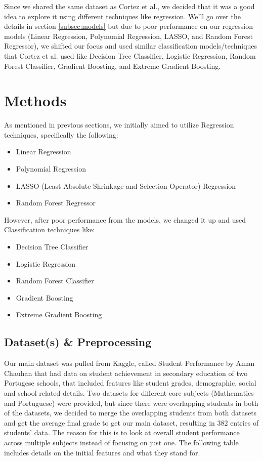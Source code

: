 \documentclass[11pt,a4paper]{article}
\begin{document}
Since we shared the same dataset as Cortez et al., we decided that it was a good idea to explore it using different techniques like regression. We'll go over the details in section \ref{subsec:models} but due to poor performance on our regression models (Linear Regression, Polynomial Regression, LASSO, and Random Forest Regressor), we shifted our focus and used similar classification models/techniques that Cortez et al. used like Decision Tree Classifier, Logistic Regression, Random Forest Classifier, Gradient Boosting, and Extreme Gradient Boosting.

\section{Methods}
As mentioned in previous sections, we initially aimed to utilize Regression techniques, specifically the following:
\begin{itemize}
    \item Linear Regression
    \item Polynomial Regression
    \item LASSO (Least Absolute Shrinkage and Selection Operator) Regression
    \item Random Forest Regressor
\end{itemize}

However, after poor performance from the models, we changed it up and used Classification techniques like:
\begin{itemize}
    \item Decision Tree Classifier
    \item Logistic Regression
    \item Random Forest Classifier
    \item Gradient Boosting
    \item Extreme Gradient Boosting
\end{itemize}

\subsection{Dataset(s) \& Preprocessing}
Our main dataset was pulled from Kaggle, called Student Performance by Aman Chauhan that had data on student achievement in secondary education of two Portugese schools, that included features like student grades, demographic, social and school related details. Two datasets for different core subjects (Mathematics and Portuguese) were provided, but since there were overlapping students in both of the datasets, we decided to merge the overlapping students from both datasets and get the average final grade to get our main dataset, resulting in 382 entries of students' data. The reason for this is to look at overall student performance across multiple subjects instead of focusing on just one. The following table includes details on the initial features and what they stand for.
\end{document}
